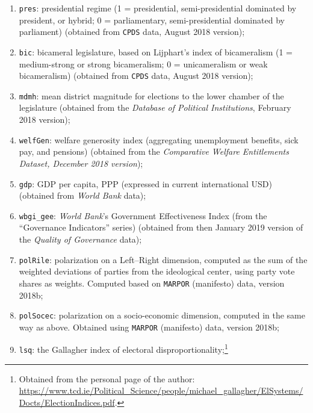 \documentclass[12pt,english]{article}
\begin{document}
\begin{enumerate}
  \item \texttt{pres}: presidential regime (1 = presidential, semi-presidential dominated by president, or hybrid; 0 = parliamentary, semi-presidential dominated by parliament) (obtained from \texttt{CPDS} data, August 2018 version);
  \item \texttt{bic}: bicameral legislature, based on Lijphart's index of bicameralism (1 = medium-strong or strong bicameralism; 0 = unicameralism or weak bicameralism) (obtained from \texttt{CPDS} data, August 2018 version);
  \item \texttt{mdmh}: mean district magnitude for elections to the lower chamber of the legislature (obtained from the \textit{Database of Political Institutions}, February 2018 version);
  \item \texttt{welfGen}: welfare generosity index (aggregating unemployment benefits, sick pay, and pensions) (obtained from the \textit{Comparative Welfare Entitlements Dataset, December 2018 version});
  \item \texttt{gdp}: GDP per capita, PPP (expressed in current international USD) (obtained from \textit{World Bank} data);
  \item \texttt{wbgi\_gee}: \textit{World Bank}'s Government Effectiveness Index (from the ``Governance Indicators'' series) (obtained from then January 2019 version of the \textit{Quality of Governance} data);
  \item \texttt{polRile}: polarization on a Left--Right dimension, computed as the sum of the weighted deviations of parties from the ideological center, using party vote shares as weights. Computed based on \texttt{MARPOR} (manifesto) data, version 2018b;
  \item \texttt{polSocec}: polarization on a socio-economic dimension, computed in the same way as above. Obtained using \texttt{MARPOR} (manifesto) data, version 2018b;
  \item \texttt{lsq}: the Gallagher index of electoral disproportionality;\footnote{Obtained from the personal page of the author: \url{https://www.tcd.ie/Political_Science/people/michael_gallagher/ElSystems/Docts/ElectionIndices.pdf}.}
\end{enumerate}
\end{document}
